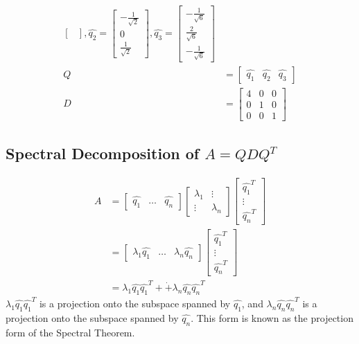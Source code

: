 \documentclass{math}
\begin{document}
\begin{align*}
\begin{bmatrix}
  \end{bmatrix}, \hat{q_2} = \begin{bmatrix}
    -\frac{1}{\sqrt{2}} \\ 0 \\ \frac{1}{\sqrt{2}}
  \end{bmatrix}, \hat{q_3} = \begin{bmatrix}
    -\frac{1}{\sqrt{6}} \\ \frac{2}{\sqrt{6}} \\ -\frac{1}{\sqrt{6}}
  \end{bmatrix} \\
  Q &= \begin{bmatrix}\hat{q_1} & \hat{q_2} & \hat{q_3}\end{bmatrix} \\
  D &= \begin{bmatrix}
    4 & 0 & 0 \\
    0 & 1 & 0 \\
    0 & 0 & 1
  \end{bmatrix}
\end{align*}

\subsection*{Spectral Decomposition of \( A = QDQ^T \)}
\begin{align*}
  A &= \begin{bmatrix}\hat{q_1} & \dots & \hat{q_n}\end{bmatrix}
    \begin{bmatrix}\lambda_1 & \vdots \\ \vdots & \lambda_n\end{bmatrix}
    \begin{bmatrix}\hat{q_1}^T \\ \vdots \\ \hat{q_n}^T\end{bmatrix} \\
  &= \begin{bmatrix}\lambda_1\hat{q_1} & \dots & \lambda_n\hat{q_n}\end{bmatrix}
    \begin{bmatrix}\hat{q_1}^T \\ \vdots \\ \hat{q_n}^T\end{bmatrix} \\
  &= \lambda_1\hat{q_1}\hat{q_1}^T+\dot+\lambda_n\hat{q_n}\hat{q_n}^T
\end{align*}
\( \lambda_1\hat{q_1}\hat{q_1}^T \) is a projection onto the subspace spanned
by \( \hat{q_1} \), and \( \lambda_n\hat{q_n}\hat{q_n}^T \) is a projection
onto the subspace spanned by \( \hat{q_n} \). This form is known as the
projection form of the Spectral Theorem.
\end{document}
